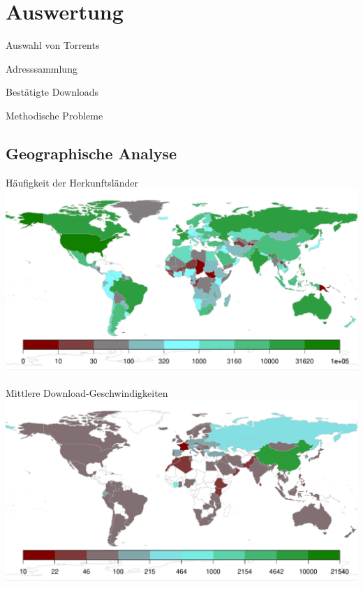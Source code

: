 \documentclass[dvipsnames]{beamer} %
\begin{document}
	\section{Auswertung}
	\begin{frame}{Auswahl von Torrents}
	\end{frame}

	\begin{frame}{Adresssammlung}
	\end{frame}

	\begin{frame}{Bestätigte Downloads}
	\end{frame}

	\begin{frame}{Methodische Probleme}
	\end{frame}

	\subsection{Geographische Analyse}
	\begin{frame}{Häufigkeit der Herkunftsländer}
    \includegraphics[width=\textwidth]{../result/2015-08-30_20-combined_location_map}
	\end{frame}

	\begin{frame}{Mittlere Download-Geschwindigkeiten}
    \includegraphics[width=\textwidth]{../result/2015-08-30_20-combined_speed_map}
	\end{frame}
\end{document}
